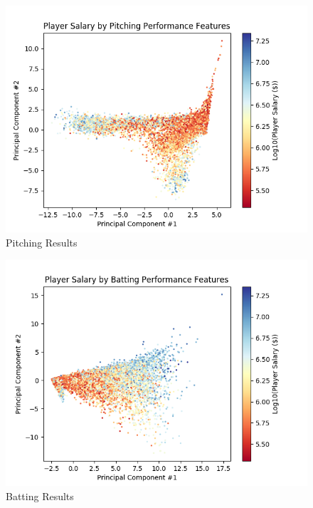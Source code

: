 \documentclass[12pt, letterpaper]{article}
\begin{document}
\begin{figure}[H]
\centering
\includegraphics[scale=0.65]{pitching.png}
\caption{Pitching Results}
\label{pitch}
\end{figure}

\begin{figure}[H]
\centering
\includegraphics[scale=0.65]{batting.png}
\caption{Batting Results}
\label{bat}
\end{figure}
\end{document}
